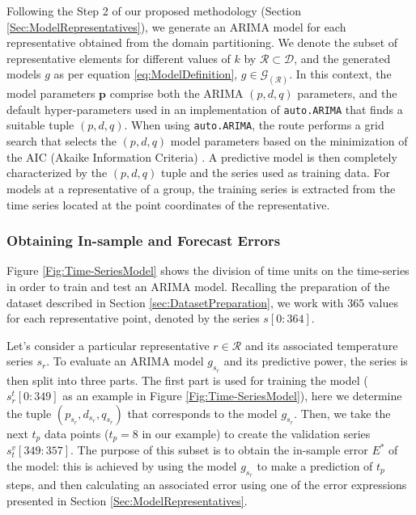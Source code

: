 Following the Step 2 of our proposed methodology (Section \ref{Sec:ModelRepresentatives}), we generate an ARIMA model for each representative obtained from the domain partitioning. We denote the subset of representative elements for different values of $k$ by $\mathcal{R} \subset \mathcal{D}$, and the generated models $g$ as per equation \ref{eq:ModelDefinition}, $g \in \mathcal{G}_{(\mathcal{R})}$. 
In this context, the model parameters $\mathbf{p}$ comprise both the ARIMA $(p, d, q)$ parameters, and the default hyper-parameters used in an implementation of \texttt{auto.ARIMA} that finds a suitable tuple $(p, d, q)$. When using \texttt{auto.ARIMA}, the route performs a grid search that selects the $(p, d, q)$ model parameters based on the minimization of the AIC (Akaike Information Criteria) \cite{Hyndman2008}. A predictive model is then completely characterized by the $(p, d, q)$ tuple and the series used as training data. For models at a representative of a group, the training series is extracted from the time series located at the point coordinates of the representative.


\subsubsection{Obtaining In-sample and Forecast Errors}
\label{sec:InSampleForecastErrors}

Figure \ref{Fig:Time-SeriesModel} shows the division of time units on the time-series in order to train and test an ARIMA model. Recalling the preparation of the dataset described in Section \ref{sec:DatasetPreparation}, we work with 365 values for each representative point, denoted by the series $s[0:364]$.

Let's consider a particular representative $r \in \mathcal{R}$ and its associated temperature series $s_r$. To evaluate an ARIMA model $g_{s_r}$ and its predictive power, the series is then split into three parts. The first part is used for training the model ($s^t_r[0:349]$ as an example in Figure \ref{Fig:Time-SeriesModel}), here we determine the tuple $(p_{s_r}, d_{s_r}, q_{s_r})$ that corresponds to the model $g_{s_r}$. Then, we take the next $t_p$ data points ($t_p = 8$ in our example) to create the validation series $s^v_t[349:357]$. The purpose of this subset is to obtain the in-sample error ${E^*}$ of the model: this is achieved by using the model $g_{s_r}$ to make a prediction of $t_p$ steps, and then calculating an associated error using one of the error expressions presented in Section \ref{Sec:ModelRepresentatives}.

